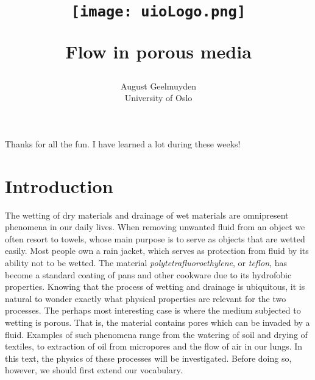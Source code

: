\documentclass[twoside,utf8]{article}
\title{
\begin{center}
\texttt{[image: uioLogo.png]}
\end{center}
\fontsize{22pt}{10pt}\selectfont Flow in porous media } %
\author{
\large
August Geelmuyden
\\[2mm] %
\normalsize
University of Oslo \\ %
}
\date{}
\begin{document}
\maketitle %
\begin{center}
	Thanks for all the fun. I have learned a lot during these weeks!
\end{center}
\tableofcontents
\newpage
\nocentering




\section{Introduction}
\begin{comment}
Place the research in a broader picture.\\
Give overview of earlier relevant studies. \\
Why this work is important. \\
\end{comment}
\noindent
The wetting of dry materials and drainage of wet materials are omnipresent phenomena in our daily lives.
When removing unwanted fluid from an object we often resort to towels, whose main purpose is to serve as objects that are wetted easily.
Most people own a rain jacket, which serves as protection from fluid by its ability not to be wetted. The material {\it polytetrafluoroethylene}, or {\it teflon}, has become a standard coating of pans and other cookware due to its hydrofobic properties.
Knowing that the process of wetting and drainage is ubiquitous, it is natural to wonder exactly what physical properties
are relevant for the two processes. The perhaps most interesting case is where the medium subjected to wetting is porous. That is, the material contains pores which can be invaded by a fluid. Examples of such phenomena range from the watering of soil and drying of textiles, to extraction of oil from micropores and the flow of air in our lungs. In this text, the physics of these processes will be investigated. Before doing so, however, we should first extend our vocabulary.
\end{document}
